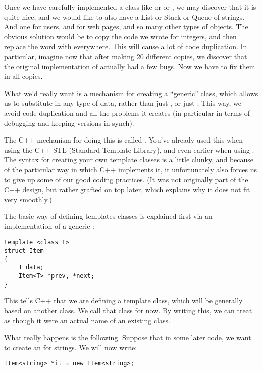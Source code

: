 Once we have carefully implemented a class like  or
 or , we may discover that it is quite nice,
and we would like to also have a List or Stack or Queue of strings.
And one for users, and for web pages, and so many other types of objects. 
The obvious solution would be to copy the code we wrote for integers,
and then replace the word  with  everywhere.
This will cause a lot of code duplication.
In particular, imagine now that after making 20 different copies, we
discover that the original implementation of 
actually had a few bugs. Now we have to fix them in all copies.

What we'd really want is a mechanism for creating a ``generic''
 class, which allows us to substitute in any type of
data, rather than just , or just .
This way, we avoid code duplication and all the problems it creates
(in particular in terms of debugging and keeping versions in synch).

The C++ mechanism for doing this is called . 
You've already used this when using the C++ STL (Standard Template
Library), and even earlier when using .
The syntax for creating your own template classes is a little clunky,
and because of the particular way in which C++ implements it, it
unfortunately also forces us to give up some of our good coding practices. 
(It was not originally part of the C++ design, but rather grafted on
top later, which explains why it does not fit very smoothly.)

The basic way of defining templates classes is explained first via an
implementation of a generic : 
\begin{verbatim}
template <class T>
struct Item
{
    T data;
    Item<T> *prev, *next;
}
\end{verbatim}

This tells C++ that we are defining a template class, which will be
generally based on another class. We call that class  for now.
By writing this, we can treat  as though it were an actual
name of an existing class.

What really happens is the following. 
Suppose that in some later code, we want to create an
 for strings. We will now write:

\begin{verbatim}
Item<string> *it = new Item<string>;
\end{verbatim}

